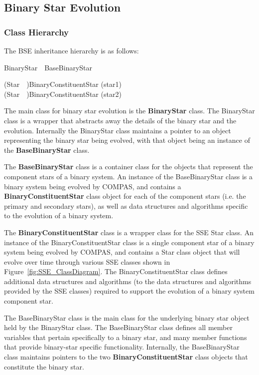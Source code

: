 \subsection{Binary Star Evolution}\label{sec:BinaryStarEvolution}

\subsubsection{Class Hierarchy}\label{sec:BSEClassHierarchy}

The BSE inheritance hierarchy is as follows:

BinaryStar\ \rarr\ BaseBinaryStar

\tabto{2em}(Star\ \rarr\ )\tabto{7em}BinaryConstituentStar (star1) \\
\tabto{2em}(Star\ \rarr\ )\tabto{7em}BinaryConstituentStar (star2)

The main class for binary star evolution is the \textbf{BinaryStar} class.  The BinaryStar class is a wrapper that abstracts away the details of the binary star and the evolution. Internally the BinaryStar class maintains a pointer to an object representing the binary star being evolved, with that object being an instance of the \textbf{BaseBinaryStar} class.

The \textbf{BaseBinaryStar} class is a container class for the objects that represent the component stars of a binary system. An instance of the BaseBinaryStar class is a binary system being evolved by COMPAS, and contains a \textbf{BinaryConstituentStar} class object for each of the component stars (i.e. the primary and secondary stars), as well as data structures and algorithms specific to the evolution of a binary system.

The \textbf{BinaryConstituentStar} class is a wrapper class for the SSE Star class. An instance of the BinaryConstituentStar class is a single component star of a binary system being evolved by COMPAS, and contains a Star class object that will evolve over time through various SSE classes shown in Figure~\ref{fig:SSE_ClassDiagram}. The BinaryConstituentStar class defines additional data structures and algorithms (to the data structures and algorithms provided by the SSE classes) required to support the evolution of a binary system component star.

The BaseBinaryStar class is the main class for the underlying binary star object held by the BinaryStar class.  The BaseBinaryStar class defines all member variables that pertain specifically to a binary star, and many member functions that provide binary-star specific functionality.  Internally, the BaseBinaryStar class maintains pointers to the two \textbf{BinaryConstituentStar} class objects that constitute the binary star.

